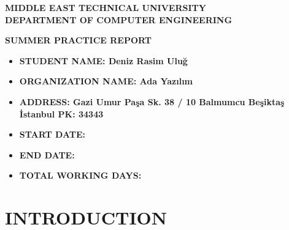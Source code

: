 \documentclass[titlepage, a4paper, 14pt]{extarticle} %
\begin{document}
\begin{titlepage}

\begin{center}

{\large\bfseries MIDDLE EAST TECHNICAL UNIVERSITY\\
               DEPARTMENT OF COMPUTER ENGINEERING\\}
               
               
\vspace{5em}            
{\LARGE\bfseries SUMMER PRACTICE REPORT\\}

\end{center}

\vspace{5em}
\begin{itemize}
\item[] \textbf{STUDENT NAME: Deniz Rasim Uluğ}       %
\item[] \textbf{ORGANIZATION NAME: Ada Yazılım}  %
\item[] \textbf{ADDRESS: Gazi Umur Paşa Sk. 38 / 10 Balmumcu Beşiktaş İstanbul PK: 34343 }            %
\item[] \textbf{START DATE: }         %
\item[] \textbf{END DATE: }           %
\item[] \textbf{TOTAL WORKING DAYS: } %
\end{itemize}
\vspace{5em}

\begin{minipage}{0.5\textwidth}
\end{minipage}
\begin{minipage}{0.5\textwidth}
\end{minipage}

\end{titlepage}

\tableofcontents
\thispagestyle{empty} %
\newpage              %


\section{INTRODUCTION} \label{intro}
\end{document}
